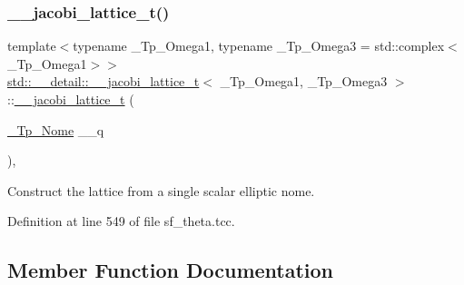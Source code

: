 \subsubsection{\texorpdfstring{\+\_\+\+\_\+jacobi\+\_\+lattice\+\_\+t()}{\_\_jacobi\_lattice\_t()}\hspace{0.1cm}{\footnotesize\ttfamily [3/3]}}
{\footnotesize\ttfamily template$<$typename \+\_\+\+Tp\+\_\+\+Omega1, typename \+\_\+\+Tp\+\_\+\+Omega3 = std\+::complex$<$\+\_\+\+Tp\+\_\+\+Omega1$>$$>$ \\
\hyperlink{structstd_1_1____detail_1_1____jacobi__lattice__t}{std\+::\+\_\+\+\_\+detail\+::\+\_\+\+\_\+jacobi\+\_\+lattice\+\_\+t}$<$ \+\_\+\+Tp\+\_\+\+Omega1, \+\_\+\+Tp\+\_\+\+Omega3 $>$\+::\hyperlink{structstd_1_1____detail_1_1____jacobi__lattice__t}{\+\_\+\+\_\+jacobi\+\_\+lattice\+\_\+t} (\begin{DoxyParamCaption}\item[{\hyperlink{structstd_1_1____detail_1_1____jacobi__lattice__t_a0de534a75abb780f607e9d3cd8b84e42}{\+\_\+\+Tp\+\_\+\+Nome}}]{\+\_\+\+\_\+q }\end{DoxyParamCaption})\hspace{0.3cm}{\ttfamily [inline]}, {\ttfamily [explicit]}}



Construct the lattice from a single scalar elliptic nome. 



Definition at line 549 of file sf\+\_\+theta.\+tcc.



\subsection{Member Function Documentation}
\mbox{\label{structstd_1_1____detail_1_1____jacobi__lattice__t_a4afbd17e958a568f58649d4dacc2e0b4}} 
